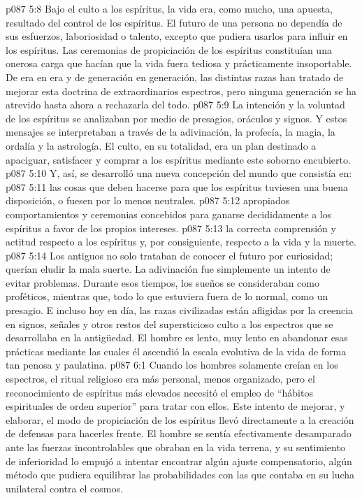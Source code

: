\vs p087 5:8 \pc Bajo el culto a los espíritus, la vida era, como mucho, una apuesta, resultado del control de los espíritus. El futuro de una persona no dependía de sus esfuerzos, laboriosidad o talento, excepto que pudiera usarlos para influir en los espíritus. Las ceremonias de propiciación de los espíritus constituían una onerosa carga que hacían que la vida fuera tediosa y prácticamente insoportable. De era en era y de generación en generación, las distintas razas han tratado de mejorar esta doctrina de extraordinarios espectros, pero ninguna generación se ha atrevido hasta ahora a rechazarla del todo.
\vs p087 5:9 La intención y la voluntad de los espíritus se analizaban por medio de presagios, oráculos y signos. Y estos mensajes se interpretaban a través de la adivinación, la profecía, la magia, la ordalía y la astrología. El culto, en su totalidad, era un plan destinado a apaciguar, satisfacer y comprar a los espíritus mediante este soborno encubierto.
\vs p087 5:10 Y, así, se desarrolló una nueva concepción del mundo que consistía en:
\vs p087 5:11  las cosas que deben hacerse para que los espíritus tuviesen una buena disposición, o fuesen por lo menos neutrales.
\vs p087 5:12  apropiados comportamientos y ceremonias concebidos para ganarse decididamente a los espíritus a favor de los propios intereses.
\vs p087 5:13  la correcta comprensión y actitud respecto a los espíritus y, por consiguiente, respecto a la vida y la muerte.
\vs p087 5:14 \pc Los antiguos no solo trataban de conocer el futuro por curiosidad; querían eludir la mala suerte. La adivinación fue simplemente un intento de evitar problemas. Durante esos tiempos, los sueños se consideraban como proféticos, mientras que, todo lo que estuviera fuera de lo normal, como un presagio. E incluso hoy en día, las razas civilizadas están afligidas por la creencia en signos, señales y otros restos del supersticioso culto a los espectros que se desarrollaba en la antigüedad. El hombre es lento, muy lento en abandonar esas prácticas mediante las cuales él ascendió la escala evolutiva de la vida de forma tan penosa y paulatina.
\vs p087 6:1 Cuando los hombres solamente creían en los espectros, el ritual religioso era más personal, menos organizado, pero el reconocimiento de espíritus más elevados necesitó el empleo de “hábitos espirituales de orden superior” para tratar con ellos. Este intento de mejorar, y elaborar, el modo de propiciación de los espíritus llevó directamente a la creación de defensas para hacerles frente. El hombre se sentía efectivamente desamparado ante las fuerzas incontrolables que obraban en la vida terrena, y su sentimiento de inferioridad lo empujó a intentar encontrar algún ajuste compensatorio, algún método que pudiera equilibrar las probabilidades con las que contaba en su lucha unilateral contra el cosmos.

